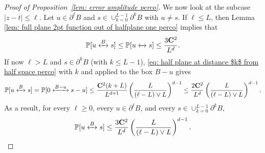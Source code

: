 \documentclass[11pt,a4paper]{article}
\numberwithin{equation}{section}
\theoremstyle{plain}
\theoremstyle{definition}
\newcommand\bfC{\mathbf{C}}
\newcommand{\connect}{\xleftrightarrow}
\begin{document}
\begin{proof}[Proof of Proposition~\textup{\ref{lem: error amplitude perco}}]
We now look at the subcase $|z-t|\leq \ell$.  
Let $u\in \partial^\ell B$ and $s\in \cup_{k=0}^{L-1}\partial^k B$ with $u\neq s$. If $\ell \leq L$, then Lemma \ref{lem: full plane 2pt function out of halfplane one perco} implies that
\begin{equation}
	\mathbb P[u\connect{B\:}s]\leq \mathbb P[u\connect{}s]\leq \frac{3\bfC^2}{L^d}.
\end{equation}
If now $\ell>L$ and $s\in \partial^kB$ (with $k\leq L-1$), \eqref{eq: half plane at distance $k$ from half space perco} with $k$ and applied to the box $B-u$ gives
\begin{equation}
	\mathbb P[u\connect{B\:}s]=\mathbb P[0\connect{B-u\:}s-u]\leq \frac{\bfC^2(k+L)}{L^{d+1}}\left(\frac{L}{(\ell-L)\vee L}\right)^{d-1}\leq \frac{2\bfC^2}{L^d}\left(\frac{L}{(\ell-L)\vee L}\right)^{d-1}.
\end{equation}
As a result, for every $\ell \geq 0$, every $u \in \partial^\ell B$, and every $s\in \cup_{k=0}^{L-1}\partial^k B$,
\begin{equation}\label{eq:boundamplitudeError7}
	\mathbb P[u\connect{B\:}s]\leq \frac{3\bfC^2}{L^d}\left(\frac{L}{(\ell-L)\vee L}\right)^{d-1}.
\end{equation}


\end{proof}
\end{document}
